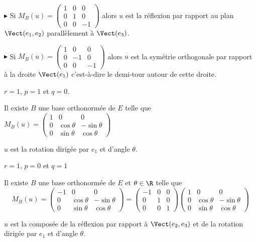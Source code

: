 $\blacktriangleright$ Si $M_B(u) = \begin{pmatrix}
    1 & 0 & 0 \\
    0 & 1 & 0 \\
    0 & 0 & -1
\end{pmatrix}$ alors $u$ est la réflexion par rapport au plan $\Vect(e_1, e_2)$ parallèlement à $\Vect(e_3)$.

\avspace $\blacktriangleright$ Si $M_B(u) = \begin{pmatrix}
    1 & 0 & 0 \\
    0 & -1 & 0 \\
    0 & 0 & -1
    \end{pmatrix}$ alors $u$ est la symétrie orthogonale par rapport à la droite 
    $\Vect(e_1)$ c'est-à-dire le demi-tour autour de cette droite. 

 $r = 1$, $p = 1$ et $q = 0$.

\svspace Il existe $B$ une base orthonormée de $E$ telle que $M_B(u) = \begin{pmatrix}
    1 & 0 & 0 \\
    0 & \cos \theta & -\sin \theta \\
    0 & \sin \theta & \cos \theta
\end{pmatrix}$

$u$ est la rotation dirigée par $e_1$ et d'angle $\theta$. 

 $r = 1$, $p = 0$ et $q = 1$

\svspace Il existe $B$ une base orthonormée de $E$ et $\theta \in \R$ telle que 
$$M_B(u) = \begin{pmatrix}
    -1 & 0 & 0 \\
    0 & \cos \theta & -\sin \theta \\
    0 & \sin \theta & \cos \theta
\end{pmatrix} = \begin{pmatrix}
    -1 & 0 & 0 \\
    0 & 1 & 0 \\
    0 & 0 & 1
\end{pmatrix} \begin{pmatrix}
    1 & 0 & 0 \\
    0 & \cos \theta & -\sin \theta \\
    0 & \sin \theta & \cos \theta
\end{pmatrix}$$

$u$ est la composée de la réflexion par rapport à $\Vect(e_2, e_3)$ et de la rotation
dirigée par $e_1$ et d'angle $\theta$.


